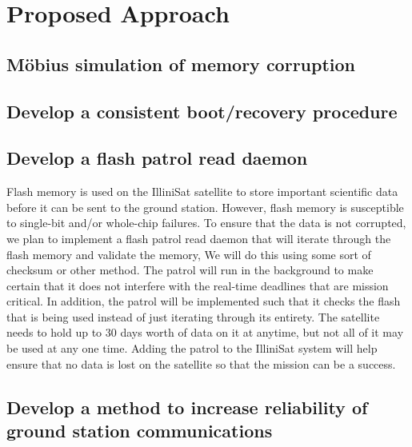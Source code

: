 \section{Proposed Approach}
\subsection{M\"obius simulation of memory corruption}

\subsection{Develop a consistent boot/recovery procedure}

\subsection{Develop a flash patrol read daemon}
Flash memory is used on the IlliniSat satellite to store important scientific data before it can be sent to the ground station. However, flash memory is susceptible to single-bit and/or whole-chip failures. To ensure that the data is not corrupted, we plan to implement a flash patrol read daemon that will iterate through the flash memory and validate the memory, We will do this using some sort of checksum or other method. The patrol will run in the background to make certain that it does not interfere with the real-time deadlines that are mission critical. In addition, the patrol will be implemented such that it checks the flash that is being used instead of just iterating through its entirety. The satellite needs to hold up to 30 days worth of data on it at anytime, but not all of it may be used at any one time. Adding the patrol to the IlliniSat system will help ensure that no data is lost on the satellite so that the mission can be a success. 

\subsection{Develop a method to increase reliability of ground station
communications}

